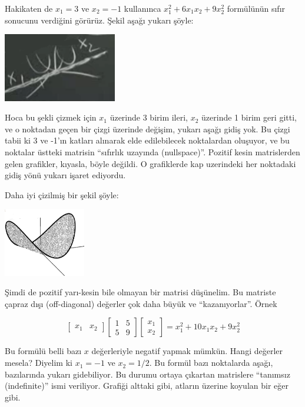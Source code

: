 \documentclass[12pt,fleqn]{article}\usepackage{../../common}
\begin{document}
Hakikaten de $x_1 = 3$ ve $x_2=-1$ kullanınca $x_1^2 + 6x_1x_2 + 9x_2^2$
formülünün sıfır sonucunu verdiğini görürüz. Şekil aşağı yukarı şöyle:

\includegraphics[height=3cm]{7_4.png}

Hoca bu şekli çizmek için $x_1$ üzerinde 3 birim ileri, $x_2$ üzerinde 1
birim geri gitti, ve o noktadan geçen bir çizgi üzerinde değişim, yukarı
aşağı gidiş yok. Bu çizgi tabii ki 3 ve -1'ın katları alınarak elde
edilebilecek noktalardan oluşuyor, ve bu noktalar üstteki matrisin
``sıfırlık uzayında (nullspace)''. Pozitif kesin matrislerden gelen
grafikler, kıyasla, böyle değildi. O grafiklerde kap uzerindeki her
noktadaki gidiş yönü yukarı işaret ediyordu.

Daha iyi çizilmiş bir şekil şöyle:

\includegraphics[height=3cm]{7_5.png}

Şimdi de pozitif yarı-kesin bile olmayan bir matrisi düşünelim. Bu matriste
çapraz dışı (off-diagonal) değerler çok daha büyük ve ``kazanıyorlar''. Örnek

$$ 
\left[\begin{array}{rr}
x_1 & x_2 
\end{array}\right]
\left[\begin{array}{rr}
1 & 5 \\
5 & 9
\end{array}\right]
\left[\begin{array}{r}
x_1 \\ x_2 
\end{array}\right] =
x_1^2 + 10x_1x_2 + 9x_2^2
 $$

Bu formülü belli bazı $x$ değerleriyle negatif yapmak mümkün. Hangi
değerler mesela? Diyelim ki $x_1 = -1$ ve $x_2 = 1/2$. Bu formül bazı
noktalarda aşağı, bazılarında yukarı gidebiliyor. Bu durumu ortaya çıkartan
matrislere ``tanımsız (indefinite)'' ismi veriliyor. Grafiği alttaki gibi,
atların üzerine koyulan bir eğer gibi. 
\end{document}
